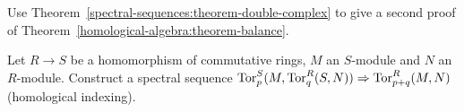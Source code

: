 \begin{exercise}\label{spectral-sequences:exercise-balance-ss}
Use Theorem~\ref{spectral-sequences:theorem-double-complex} to give a second proof of
Theorem~\ref{homological-algebra:theorem-balance}.
\end{exercise}

\begin{exercise}\label{spectral-sequences:exercise-base-change-tor}
Let $R \to S$ be a homomorphism of commutative rings, $M$ an $S$-module and $N$ an $R$-module. Construct a spectral sequence
$\operatorname{Tor}_p^S(M, \operatorname{Tor}_q^R(S, N)) \Rightarrow \operatorname{Tor}_{p+q}^R(M, N)$ (homological indexing).
\end{exercise}
